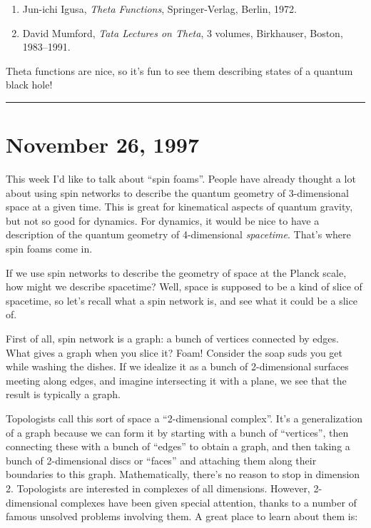 \documentclass{article}
\begin{document}
\begin{enumerate}
\def\labelenumi{\arabic{enumi})}
\setcounter{enumi}{7}
\item
  Jun-ichi Igusa, \emph{Theta Functions}, Springer-Verlag, Berlin, 1972.
\item
  David Mumford, \emph{Tata Lectures on Theta}, 3 volumes, Birkhauser,
  Boston, 1983--1991.
\end{enumerate}

Theta functions are nice, so it's fun to see them describing states of a
quantum black hole!

\begin{center}\rule{0.5\linewidth}{0.5pt}\end{center}
\hypertarget{week113}{%
\section{November 26, 1997}\label{week113}}

This week I'd like to talk about ``spin foams''. People have already
thought a lot about using spin networks to describe the quantum geometry
of 3-dimensional space at a given time. This is great for kinematical
aspects of quantum gravity, but not so good for dynamics. For dynamics,
it would be nice to have a description of the quantum geometry of
4-dimensional \emph{spacetime}. That's where spin foams come in.

If we use spin networks to describe the geometry of space at the Planck
scale, how might we describe spacetime? Well, space is supposed to be a
kind of slice of spacetime, so let's recall what a spin network is, and
see what it could be a slice of.

First of all, spin network is a graph: a bunch of vertices connected by
edges. What gives a graph when you slice it? Foam! Consider the soap
suds you get while washing the dishes. If we idealize it as a bunch of
2-dimensional surfaces meeting along edges, and imagine intersecting it
with a plane, we see that the result is typically a graph.

Topologists call this sort of space a ``2-dimensional complex''. It's a
generalization of a graph because we can form it by starting with a
bunch of ``vertices'', then connecting these with a bunch of ``edges''
to obtain a graph, and then taking a bunch of 2-dimensional discs or
``faces'' and attaching them along their boundaries to this graph.
Mathematically, there's no reason to stop in dimension 2. Topologists
are interested in complexes of all dimensions. However, 2-dimensional
complexes have been given special attention, thanks to a number of
famous unsolved problems involving them. A great place to learn about
them is:
\end{document}
